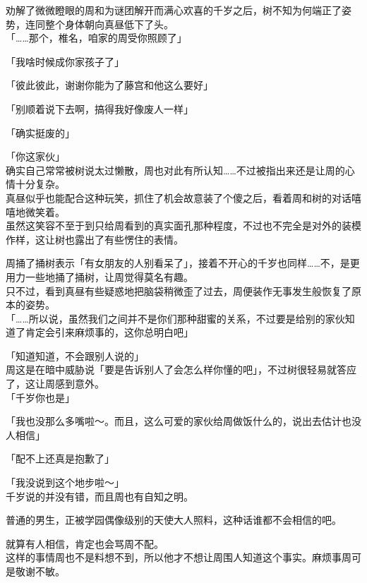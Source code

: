 劝解了微微瞪眼的周和为谜团解开而满心欢喜的千岁之后，树不知为何端正了姿势，连同整个身体朝向真昼低下了头。\\

「……那个，椎名，咱家的周受你照顾了」

「我啥时候成你家孩子了」

「彼此彼此，谢谢你能为了藤宫和他这么要好」

「别顺着说下去啊，搞得我好像废人一样」

「确实挺废的」

「你这家伙」\\

确实自己常常被树说太过懒散，周也对此有所认知……不过被指出来还是让周的心情十分复杂。\\

真昼似乎也能配合这种玩笑，抓住了机会故意装了个傻之后，看着周和树的对话嘻嘻地微笑着。\\

虽然这笑容不至于到只给周看到的真实面孔那种程度，不过也不完全是对外的装模作样，这让树也露出了有些愣住的表情。

周捅了捅树表示「有女朋友的人别看呆了」，接着不开心的千岁也同样……不，是更用力一些地捅了捅树，让周觉得莫名有趣。\\

只不过，看到真昼有些疑惑地把脑袋稍微歪了过去，周便装作无事发生般恢复了原本的姿势。\\

「……所以说，虽然我们之间并不是你们那种甜蜜的关系，不过要是给别的家伙知道了肯定会引来麻烦事的，这你总明白吧」

「知道知道，不会跟别人说的」\\

周这是在暗中威胁说「要是告诉别人了会怎么样你懂的吧」，不过树很轻易就答应了，这让周感到意外。\\

「千岁你也是」

「我也没那么多嘴啦～。而且，这么可爱的家伙给周做饭什么的，说出去估计也没人相信」

「配不上还真是抱歉了」

「我没说到这个地步啦～」\\

千岁说的并没有错，而且周也有自知之明。

普通的男生，正被学园偶像级别的天使大人照料，这种话谁都不会相信的吧。

就算有人相信，肯定也会骂周不配。\\

这样的事情周也不是料想不到，所以他才不想让周围人知道这个事实。麻烦事周可是敬谢不敏。\\

